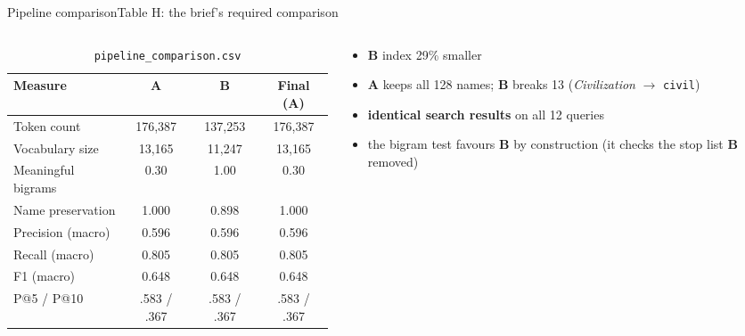 \documentclass[
  aspectratio=169,
  10pt,
  t,
]{beamer}
\newcommand{\A}{\textcolor{pipeA}{\textbf{A}}}
\newcommand{\B}{\textcolor{pipeB}{\textbf{B}}}
\begin{document}
\begin{frame}{Pipeline comparison}{Table H: the brief's required comparison}
\begin{columns}[T]
\begin{column}{.6\textwidth}
\begin{table}
\footnotesize
\begin{tabular}{lccc}
\toprule
Measure & \A & \B & Final (\A) \\
\midrule
Token count & 176,387 & 137,253 & 176,387 \\
Vocabulary size & 13,165 & 11,247 & 13,165 \\
Meaningful bigrams & 0.30 & 1.00 & 0.30 \\
Name preservation & \alert{1.000} & 0.898 & 1.000 \\
Precision (macro) & 0.596 & 0.596 & 0.596 \\
Recall (macro) & 0.805 & 0.805 & 0.805 \\
F1 (macro) & \alert{0.648} & \alert{0.648} & 0.648 \\
P@5 / P@10 & .583 / .367 & .583 / .367 & .583 / .367 \\
\bottomrule
\end{tabular}
\caption{\texttt{pipeline\_comparison.csv}}
\end{table}
\end{column}
\begin{column}{.36\textwidth}
\small
\begin{itemize}
  \item \B{} index \alert{29\% smaller}
  \item \A{} keeps \alert{all 128 names}; \B{} breaks 13 (\emph{Civilization} $\rightarrow$ \texttt{civil})
  \item \textbf{identical search results} on all 12 queries
  \item the bigram test favours \B{} by construction (it checks the stop list \B{} removed)
\end{itemize}
\end{column}
\end{columns}
\end{frame}
\end{document}
